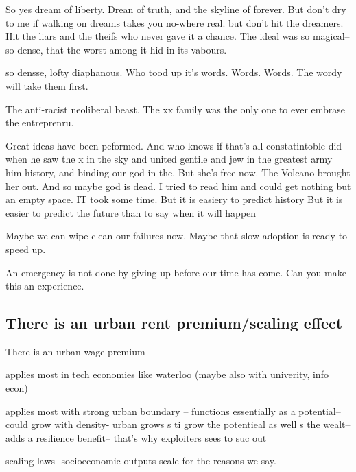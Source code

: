 So yes dream of liberty. Drean of truth, and the skyline of forever. But don't dry to me if walking on dreams takes you no-where real.
but don't hit the dreamers.
Hit the liars and the theifs who never gave it a chance.
The ideal was so magical-- so dense, that the worst among it hid in its vabours. 

so densse, lofty diaphanous. Who tood up it's words.
Words. Words. 
The wordy will take them first.

The anti-racist neoliberal beast.
The xx family was the only one to ever embrase the entreprenru.

Great ideas have been peformed. 
And who knows if that's all constatintoble did when he saw the x in the sky and united gentile and jew in the greatest army him history, and binding our god in the. 
But she's free now. The Volcano brought her out. 
And so maybe god is dead. I tried to read him and could get nothing but an empty space.
IT took some time. 
But it is easiery to predict history
But it is easier to predict the future than to say when it will happen

Maybe we can wipe clean our failures now. 
Maybe that slow adoption is ready to speed up.

An emergency is not done by giving up before our time has come. 
Can you make this an experience. 




\subsection{There is an urban rent premium/scaling effect}
There is an urban wage premium %

applies most in tech economies like waterloo (maybe also with univerity,   info econ)

applies most with strong urban boundary -- functions essentially as a potential-- could grow with density- urban grows s ti grow the potentieal as well s the wealt-- adds a resilience benefit-- that's why exploiters sees to suc out

scaling laws- socioeconomic outputs scale for the reasons we say.


